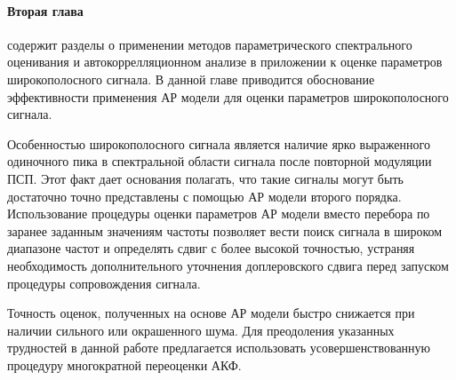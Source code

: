 \paragraph{Вторая глава} содержит разделы о применении методов параметрического спектрального оценивания и автокоррелляционном анализе в приложении к оценке
параметров широкополосного сигнала. В данной главе приводится обоснование эффективности применения АР модели для оценки параметров широкополосного сигнала.

Особенностью широкополосного сигнала является наличие ярко выраженного одиночного пика в спектральной области сигнала после повторной модуляции ПСП. 
Этот факт дает основания полагать, что такие сигналы могут быть достаточно точно представлены с помощью АР модели второго порядка.
Использование процедуры оценки параметров АР модели вместо перебора по заранее заданным значениям частоты позволяет вести поиск сигнала
в широком диапазоне частот и определять сдвиг с более высокой точностью, устраняя необходимость дополнительного уточнения
доплеровского сдвига перед запуском процедуры сопровождения сигнала.

Точность оценок, полученных на основе АР модели быстро снижается при наличии сильного или окрашенного шума. Для преодоления указанных
трудностей в данной работе предлагается использовать усовершенствованную процедуру многократной переоценки АКФ. 
